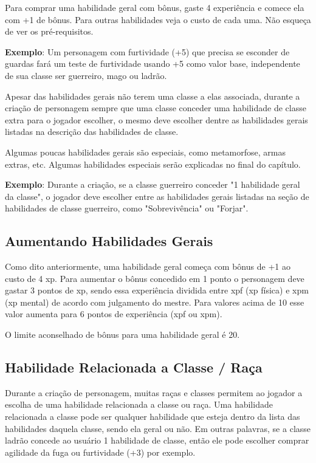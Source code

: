 Para comprar uma habilidade geral com bônus, gaste 4 experiência e comece ela com +1 de bônus. Para outras habilidades veja o custo de cada uma. Não esqueça de ver os pré-requisitos.

\textbf{Exemplo}: Um personagem com furtividade (+5) que precisa se esconder de guardas fará um teste de furtividade usando +5 como valor base, independente de sua classe ser guerreiro, mago ou ladrão.

Apesar das habilidades gerais não terem uma classe a elas associada, durante a criação de personagem sempre que uma classe conceder uma habilidade de classe extra para o jogador escolher, o mesmo deve escolher dentre as habilidades gerais listadas na descrição das habilidades de classe.

Algumas poucas habilidades gerais são especiais, como metamorfose, armas extras, etc. Algumas habilidades especiais serão explicadas no final do capítulo.

\textbf{Exemplo}: Durante a criação, se a classe guerreiro conceder "1 habilidade geral da classe", o jogador deve escolher entre as habilidades gerais listadas na seção de habilidades de classe guerreiro, como "Sobrevivência" ou "Forjar".


\subsection{Aumentando Habilidades Gerais}

Como dito anteriormente, uma habilidade geral começa com bônus de +1 ao custo de 4 xp. Para aumentar o bônus concedido em 1 ponto o personagem deve gastar 3 pontos de xp, sendo essa experiência dividida entre xpf (xp física) e xpm (xp mental) de acordo com julgamento do mestre. Para valores acima de 10 esse valor aumenta para 6 pontos de experiência (xpf ou xpm).

O limite aconselhado de bônus para uma habilidade geral é 20.

\subsection{Habilidade Relacionada a Classe / Raça}
 
Durante a criação de personagem, muitas raças e classes permitem ao jogador a escolha de uma habilidade relacionada a classe ou raça. Uma habilidade relacionada a classe pode ser qualquer habilidade que esteja dentro da lista das habilidades daquela classe, sendo ela geral ou não. Em outras palavras, se a classe ladrão concede ao usuário 1 habilidade de classe, então ele pode escolher comprar agilidade da fuga ou furtividade (+3) por exemplo.

